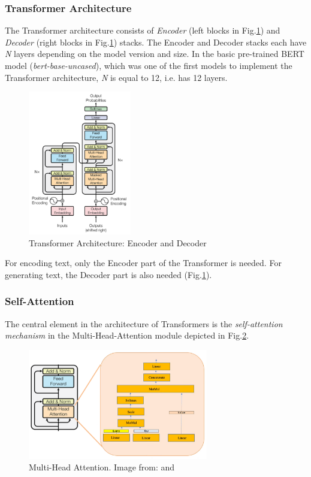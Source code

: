 \subsubsection{Transformer Architecture}
The \gls{Transformer} architecture consists of \emph{Encoder} (left blocks in Fig.\ref{fig:transformers}) and \emph{Decoder} (right blocks in Fig.\ref{fig:transformers}) stacks.
The Encoder and Decoder stacks each have \emph{N} layers depending on the model version and size.
In the basic pre-trained \gls{BERT} \cite{BERT} model (\emph{bert-base-uncased}), which was one of the first models to implement the \gls{Transformer} architecture, \emph{N} is equal to 12, i.e. has 12 layers.

\begin{figure}[H]
	\centering
	\includegraphics[width=0.4\textwidth]{Assets/transformers}
	\caption{\gls{Transformer} Architecture: Encoder and Decoder}
	\label{fig:transformers}
\end{figure}

For encoding text, only the Encoder part of the \gls{Transformer} is needed.
For generating text, the Decoder part is also needed (Fig.\ref{fig:transformers}).

\subsubsection{Self-Attention}
The central element in the architecture of \glspl{Transformer} is the \emph{self-attention mechanism} in the Multi-Head-Attention module depicted in Fig.\ref{fig:attn1}.

\begin{figure}[H]
	\centering
	\includegraphics[width=0.7\textwidth]{Assets/attn1}
	\caption{Multi-Head Attention. Image from: \cite{BERT} and \cite{transformersyoutube}}
	\label{fig:attn1}
\end{figure}

